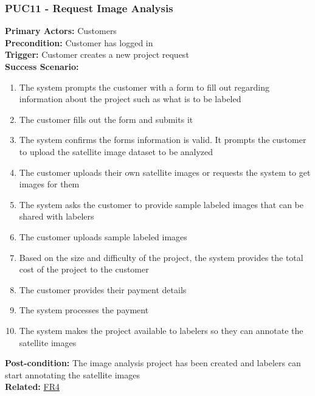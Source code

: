 \documentclass[12pt]{article}
\begin{document}
\subsubsection*{PUC11 - Request Image Analysis}
\label{sec:PUC11}
\textbf{Primary Actors:} Customers\\
\textbf{Precondition:} Customer has logged in\\
\textbf{Trigger:} Customer creates a new project request\\
\textbf{Success Scenario:}
\begin{enumerate}
    \item The system prompts the customer with a form to fill out regarding information about the project such as what is to be labeled
    \item The customer fills out the form and submits it
    \item The system confirms the forms information is valid. It prompts the customer to upload the satellite image dataset to be analyzed
    \item The customer uploads their own satellite images or requests the system to get images for them
    \item The system asks the customer to provide sample labeled images that can be shared with labelers
    \item The customer uploads sample labeled images
    \item Based on the size and difficulty of the project, the system provides the total cost of the project to the customer
    \item The customer provides their payment details
    \item The system processes the payment
    \item The system makes the project available to labelers so they can annotate the satellite images
\end{enumerate}
\textbf{Post-condition:} The image analysis project has been created and labelers can start annotating the satellite images\\
\textbf{Related:} \hyperref[sec:FR4]{FR4}
\end{document}
